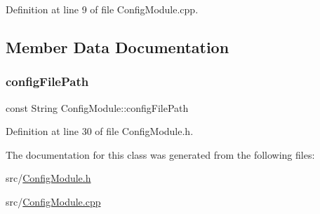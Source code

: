 Definition at line 9 of file Config\+Module.\+cpp.



\subsection{Member Data Documentation}
\mbox{\label{class_config_module_a0738d7b1088e75c5503a894e88d439aa}} 
\subsubsection{\texorpdfstring{configFilePath}{configFilePath}}
{\footnotesize\ttfamily const String Config\+Module\+::config\+File\+Path\hspace{0.3cm}{\ttfamily [private]}}



Definition at line 30 of file Config\+Module.\+h.



The documentation for this class was generated from the following files\+:\begin{DoxyCompactItemize}
\item 
src/\mbox{\hyperlink{_config_module_8h}{Config\+Module.\+h}}\item 
src/\mbox{\hyperlink{_config_module_8cpp}{Config\+Module.\+cpp}}\end{DoxyCompactItemize}
